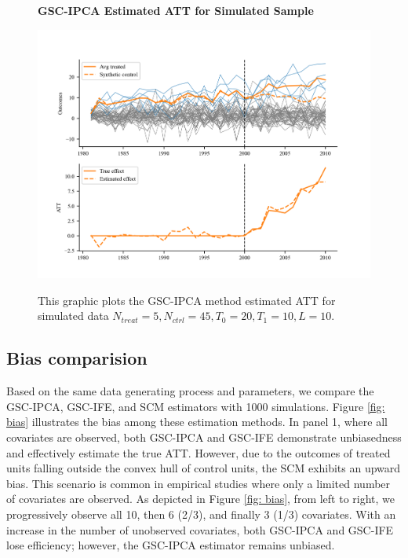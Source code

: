 \documentclass[12pt]{article}
\begin{document}
\begin{figure}[!ht]
    \centering
    \caption{\textbf{GSC-IPCA Estimated ATT for Simulated Sample}}
    \includegraphics{figs/estimation.png}
    \label{fig: est}
    \caption*{\footnotesize{This graphic plots the GSC-IPCA method estimated ATT for simulated data $N_{treat} = 5, N_{ctrl} = 45, T_0=20, T_1=10, L=10$.}}
    \end{figure}

\subsection{Bias comparision}
Based on the same data generating process and parameters, we compare the GSC-IPCA, GSC-IFE, and SCM estimators with 1000 simulations. Figure \ref{fig: bias} illustrates the bias among these estimation methods. In panel 1, where all covariates are observed, both GSC-IPCA and GSC-IFE demonstrate unbiasedness and effectively estimate the true ATT. However, due to the outcomes of treated units falling outside the convex hull of control units, the SCM exhibits an upward bias. This scenario is common in empirical studies where only a limited number of covariates are observed. As depicted in Figure \ref{fig: bias}, from left to right, we progressively observe all 10, then 6 (2/3), and finally 3 (1/3) covariates. With an increase in the number of unobserved covariates, both GSC-IPCA and GSC-IFE lose efficiency; however, the GSC-IPCA estimator remains unbiased.
\end{document}
